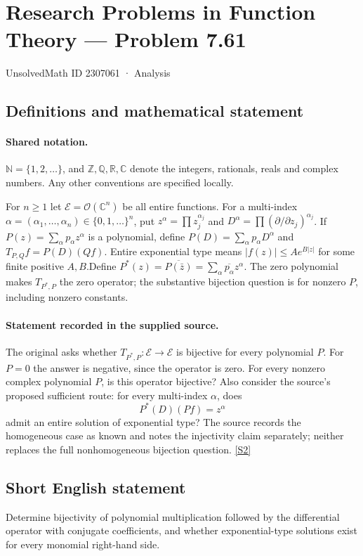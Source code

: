 \documentclass[11pt]{article}
\newcommand{\sref}[2]{\hyperlink{source:#1:#2}{[S#2]}}
\begin{document}
\setcounter{section}{2307060}
\section{Research Problems in Function Theory — Problem 7.61}\label{2307061}
{\small\sffamily UnsolvedMath ID 2307061 · Analysis}
\subsection{Definitions and mathematical statement}

\paragraph{Shared notation.}$\mathbb N=\{1,2,\ldots\}$, and $\mathbb Z,\mathbb Q,\mathbb R,\mathbb C$ denote the integers, rationals, reals and complex numbers. Any other conventions are specified locally.


For $n\ge1$ let $\mathcal E=\mathcal O(\mathbb C^n)$ be all entire functions. For a multi-index $\alpha=(\alpha_1,\ldots,\alpha_n)\in\{0,1,\ldots\}^n$, put $z^\alpha=\prod z_j^{\alpha_j}$ and $D^\alpha=\prod(\partial/\partial z_j)^{\alpha_j}$. If $P(z)=\sum_\alpha p_\alpha z^\alpha$ is a polynomial, define $P(D)=\sum_\alpha p_\alpha D^\alpha$ and $T_{P,Q}f=P(D)(Qf)$. Entire exponential type means $|f(z)|\le A e^{B|z|}$ for some finite positive $A,B$.Define $P^*(z)=\overline{P(\bar z)}=\sum_\alpha\overline{p_\alpha}z^\alpha$. The zero polynomial makes $T_{P^*,P}$ the zero operator; the substantive bijection question is for nonzero $P$, including nonzero constants.
\paragraph{Statement recorded in the supplied source.}
The original asks whether $T_{P^*,P}:\mathcal E\to\mathcal E$ is bijective for every polynomial $P$. For $P=0$ the answer is negative, since the operator is zero. For every nonzero complex polynomial $P$, is this operator bijective? Also consider the source's proposed sufficient route: for every multi-index $\alpha$, does
\[P^*(D)(Pf)=z^\alpha
\]
admit an entire solution of exponential type? The source records the homogeneous case as known and notes the injectivity claim separately; neither replaces the full nonhomogeneous bijection question. \sref{2307061}{2}
\subsection{Short English statement}
Determine bijectivity of polynomial multiplication followed by the differential operator with conjugate coefficients, and whether exponential-type solutions exist for every monomial right-hand side.
\end{document}
